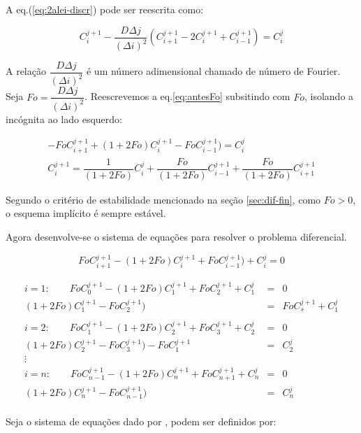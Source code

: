 A eq.(\ref{eq:2alei-discr}) pode ser reescrita como:

\begin{equation}
\label{eq:antesFo}
C_i^{j+1} - \frac{D\Delta j}{(\Delta i)^2} (C_{i+1}^{j+1} - 2C_i^{j+1} + C_{i-1}^{j+1}) = C_i^j
\end{equation}

A relação $\dfrac{D\Delta j}{(\Delta i)^2}$ é um número adimensional chamado de número de Fourier. Seja $Fo = \dfrac{D\Delta j}{(\Delta i)^2} $. Reescrevemos a eq.\ref{eq:antesFo} subsitindo com $Fo$, isolando a incógnita ao lado esquerdo:

\begin{gather*}
\label{eq:depoisFo}
- FoC_{i+1}^{j+1} + (1+2Fo)C_i^{j+1} - FoC_{i-1}^{j+1}) = C_i^j \\
C_i^{j+1} = \dfrac{1}{(1+2Fo)}C_i^j + \dfrac{Fo}{(1+2Fo)}C_{i-1}^{j+1} + \dfrac{Fo}{(1+2Fo)}C_{i+1}^{j+1}
\end{gather*}

Segundo o critério de estabilidade mencionado na seção \ref{sec:dif-fin}, como $Fo>0$, o esquema implícito é sempre estável.

Agora desenvolve-se o sistema de equações para resolver o problema diferencial.

\begin{equation*}
FoC_{i+1}^{j+1} - (1+2Fo)C_i^{j+1} + FoC_{i-1}^{j+1}) + C_i^j = 0
\end{equation*}

\begin{equation*}
\label{eq:depoisFo}
\begin{matrix}
i = 1: \qquad FoC_{0}^{j+1} - (1+2Fo)C_1^{j+1} + FoC_{2}^{j+1} + C_1^j & = & 0\\
(1+2Fo)C_1^{j+1} - FoC_{2}^{j+1})& = & FoC_{s}^{j+1}  + C_1^j \\ 
\\
i = 2: \qquad FoC_{1}^{j+1} - (1+2Fo)C_2^{j+1} + FoC_{3}^{j+1} + C_2^j & = & 0\\
(1+2Fo)C_2^{j+1} - FoC_{3}^{j+1}) - FoC_{1}^{j+1} & = & C_2^j \\ 
\vdots \\
i = n: \qquad FoC_{n-1}^{j+1} - (1+2Fo)C_n^{j+1} + FoC_{n+1}^{j+1} + C_n^j & = & 0\\
(1+2Fo)C_n^{j+1} - FoC_{n-1}^{j+1}) & = & C_n^j \\ 
\end{matrix}
\end{equation*}

Seja o sistema de equações dado por ,  podem ser definidos por:

